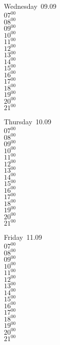 \documentclass[11pt,a4paper]{book}\usepackage[]{graphicx}\usepackage[]{color}
\begin{document}
\begin{weekdaybox}
  Wednesday~09.09\\
  { 
  \vfill
  $07^{00}$\\
$08^{00}$\\
$09^{00}$\\
$10^{00}$\\
$11^{00}$\\
$12^{00}$\\
$13^{00}$\\
$14^{00}$\\
$15^{00}$\\
$16^{00}$\\
$17^{00}$\\
$18^{00}$\\
$19^{00}$\\
$20^{00}$\\
$21^{00}$\\
  }
\end{weekdaybox}
\clearpage
\begin{headerbox}
\end{headerbox}
\begin{weekdaybox}
  Thursday~10.09\\
  { 
  \vfill
  $07^{00}$\\
$08^{00}$\\
$09^{00}$\\
$10^{00}$\\
$11^{00}$\\
$12^{00}$\\
$13^{00}$\\
$14^{00}$\\
$15^{00}$\\
$16^{00}$\\
$17^{00}$\\
$18^{00}$\\
$19^{00}$\\
$20^{00}$\\
$21^{00}$\\
  }
\end{weekdaybox} 
\begin{weekdaybox}
  Friday~11.09\\
  { 
  \vfill
  $07^{00}$\\
$08^{00}$\\
$09^{00}$\\
$10^{00}$\\
$11^{00}$\\
$12^{00}$\\
$13^{00}$\\
$14^{00}$\\
$15^{00}$\\
$16^{00}$\\
$17^{00}$\\
$18^{00}$\\
$19^{00}$\\
$20^{00}$\\
$21^{00}$\\
  }
\end{weekdaybox}
\end{document}
